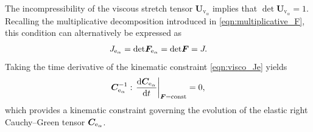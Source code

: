 The incompressibility of the viscous stretch tensor $\boldsymbol{U}_{\mathrm{v}_{\alpha}}$ implies that
$\det \boldsymbol{U}_{\mathrm{v}_{\alpha}} = 1$. Recalling the multiplicative decomposition introduced in \eqref{eqn:multiplicative_F}, this condition can alternatively be expressed as
%
\begin{equation}
	\label{eqn:visco_Je}
	J_{\mathrm{e}_{\alpha}}
	=
	\mathrm{det} \boldsymbol{F}_{\mathrm{e}_{\alpha}}
	=
	\mathrm{det} \boldsymbol{F}
	=
	J .
\end{equation}
%
Taking the time derivative of the kinematic constraint \eqref{eqn:visco_Je} yields
%
\begin{equation}
	\label{eqn:visco_Je_t}
	\boldsymbol{C}_{\mathrm{e}_{\alpha}}^{-1}
	:
	\left.
	\frac{\mathrm{d}\boldsymbol{C}_{\mathrm{e}_{\alpha}}}{\mathrm{d}t}
	\right|_{\boldsymbol{F}=\text{const}}
	=
	0,
\end{equation}
%
which provides a kinematic constraint governing the evolution of the elastic right Cauchy--Green tensor $\boldsymbol{C}_{\mathrm{e}_{\alpha}}$.

